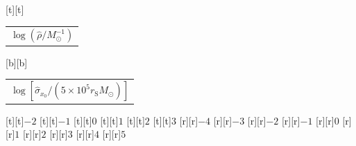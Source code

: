 %    
%
%
\begin{psfrags}%
\psfragscanon%
%
[t][t]{\color[rgb]{0,0,0}\setlength{\tabcolsep}{0pt}\begin{tabular}{c}{\Large$\log\left(\hat{\rho}/M_\odot^{-1}\right)$}\end{tabular}}%
[b][b]{\color[rgb]{0,0,0}\setlength{\tabcolsep}{0pt}\begin{tabular}{c}{\Large$\log\left[\hat{\sigma}_{x_0}/\left(5 \times 10^5 r_\mathrm{S} M_\odot\right)\right]$}\end{tabular}}%
%
[t][t]{$-2$}%
[t][t]{$-1$}%
[t][t]{$0$}%
[t][t]{$1$}%
[t][t]{$2$}%
[t][t]{$3$}%
%
[r][r]{$-4$}%
[r][r]{$-3$}%
[r][r]{$-2$}%
[r][r]{$-1$}%
[r][r]{$0$}%
[r][r]{$1$}%
[r][r]{$2$}%
[r][r]{$3$}%
[r][r]{$4$}%
[r][r]{$5$}%
%
%
\end{psfrags}%
%
